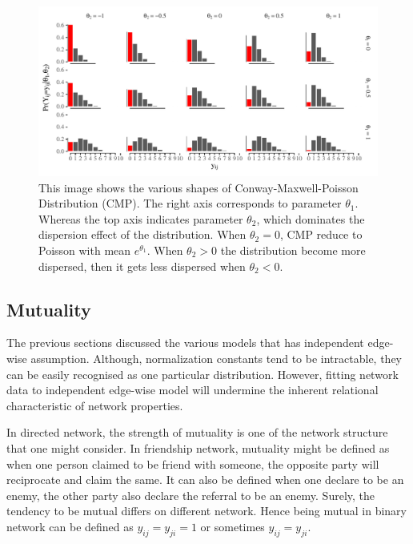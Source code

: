 \documentclass[12pt,a4paper,twoside,openany]{book}
\makeatletter
\def\maxwidth{ %
  \ifdim\Gin@nat@width>\linewidth
    \linewidth
  \else
    \Gin@nat@width
  \fi
}
\newenvironment{knitrout}{}{} %
\makeatother
\begin{document}
\begin{figure}[H]
\begin{knitrout}
\color{fgcolor}

{\centering \includegraphics[width=\maxwidth]{figure/unnamed-chunk-2-1} 

}



\end{knitrout}
\caption ["Illustration of Conway-Maxwell-Poisson Distribution"]{This image shows the various shapes of Conway-Maxwell-Poisson Distribution (CMP). The right axis corresponds to parameter $\theta_1$. Whereas the top axis indicates parameter $\theta_2$, which dominates the dispersion effect of the distribution. When $\theta_2 = 0$, CMP reduce to Poisson with mean $e^{\theta_1}$. When $\theta_2 >0$ the distribution become more dispersed, then it gets less dispersed when $\theta_2<0$.}  
\end{figure}


\subsection{Mutuality}
The previous sections discussed the various models that has independent edge-wise assumption. Although, normalization constants tend to be intractable, they can be easily recognised as one particular distribution. However, fitting network data to independent edge-wise model will undermine the inherent relational characteristic of network properties. 

In directed network, the strength of mutuality is one of the network structure that one might consider. In friendship network, mutuality might be defined as when one person claimed to be friend with someone, the opposite party will reciprocate and claim the same. It can also be defined when one declare to be an enemy, the other party also declare the referral to be an enemy. Surely, the tendency to be mutual differs on different network. Hence being mutual in binary network can be defined as $y_{ij}=y_{ji}=1$ or sometimes $y_{ij}=y_{ji}$.
\end{document}
